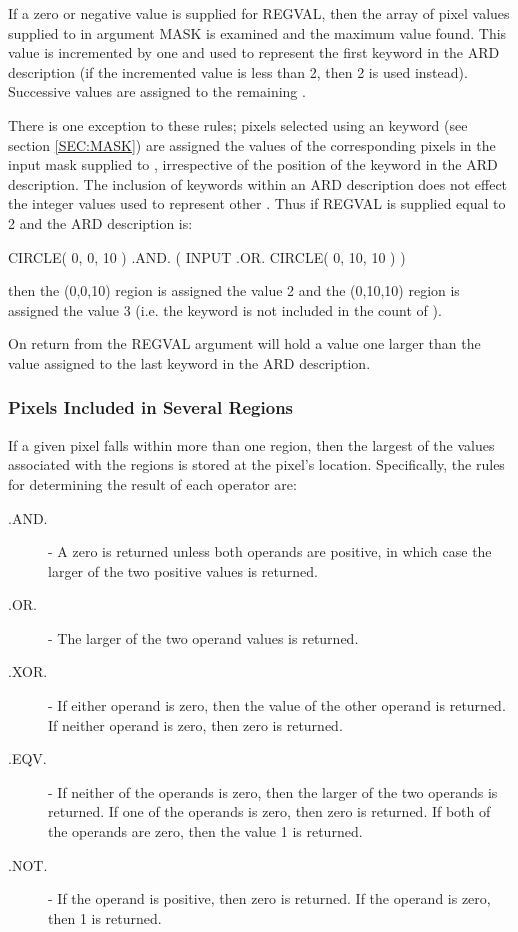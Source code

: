 \documentclass[11pt]{starlink}
\begin{document}
If a zero or negative value is supplied for REGVAL, then the array of pixel
values supplied to  in argument MASK is examined and the maximum value
found. This value is incremented by one and used to represent the first keyword
in the ARD description (if the incremented value is less than 2, then 2 is used
instead). Successive values are assigned to the remaining .

There is one exception to these rules; pixels selected using an  keyword
(see section \ref{SEC:MASK}) are assigned the values of the corresponding pixels
in the input mask supplied to , irrespective of the position of the
 keyword in the ARD description. The inclusion of  keywords within an
ARD description does not effect the integer values used to represent other
. Thus if REGVAL is supplied equal to 2 and the ARD description is:

\small
\begin{terminalv}
      CIRCLE( 0, 0, 10 ) .AND. ( INPUT .OR. CIRCLE( 0, 10, 10 ) )
\end{terminalv}
\normalsize

then the (0,0,10) region is assigned the value 2 and the (0,10,10)
region is assigned the value 3 (i.e. the  keyword is not included in the
count of ).

On return from  the REGVAL argument will hold a value one larger than
the value assigned to the last keyword in the ARD description.

\subsubsection{Pixels Included in Several Regions}
If a given pixel falls within more than one region, then the largest of the
values associated with the regions is stored at the pixel's location.
Specifically, the rules for determining the result of each operator are:

\begin{description}
\item [.AND.] - A zero is returned unless both operands are positive, in which
case the larger of the two positive values is returned.
\item [.OR.] - The larger of the two operand values is returned.
\item [.XOR.] - If either operand is zero, then the value of the other operand
is returned. If neither operand is zero, then zero is returned.
\item [.EQV.] - If neither of the operands is zero, then the larger of the two
operands is returned. If one of the operands is zero, then zero is returned. If
both of the operands are zero, then the value 1 is returned.
\item [.NOT.] - If the operand is positive, then zero is returned. If the
operand is zero, then 1 is returned.
\end{description}
\end{document}
